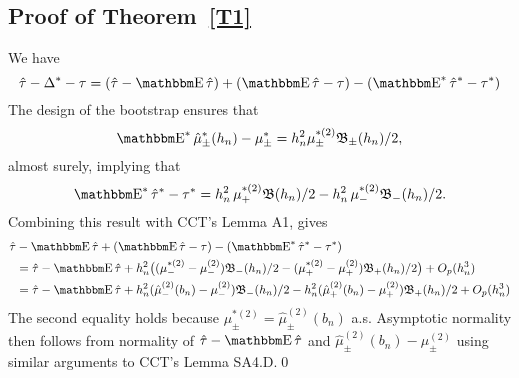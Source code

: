\documentclass[12pt,fleqn]{article}
\begin{document}
\subsection{Proof of Theorem~\ref{T1}}
We have
\begin{equation*}
  \hat\tau - \Delta^* - \tau = (\hat\tau - \E \hat \tau) +
  (\E \hat \tau - \tau) - (\E^* \hat \tau^* - \tau^*)
\end{equation*}
The design of the bootstrap ensures that
\begin{equation*}
  \label{eq:6}
  \E^* \hat\mu_{\pm}^*(h_n) - \mu_{\pm}^{*} =
  h_n^{2} \mu_\pm^{*(2)} \Bf_{\pm}(h_n)/2,
\end{equation*}
almost surely, implying that
\begin{equation*}
  \label{eq:7}
    \E^* \hat\tau^{*} - \tau^{*} = h_n^2\, \mu_+^{*(2)} \Bf(h_n)/2
      - h_n^2\, \mu_{-}^{*(2)} \Bf_{-}(h_n)/2.
\end{equation*}
Combining this result with CCT's Lemma A1, gives
\begin{align*}
  \hat\tau &- \E \hat\tau + (\E \hat\tau - \tau) - (\E^* \hat\tau^* - \tau^*)\\
  &= \hat\tau - \E\hat\tau
   + h_n^2 \big((\mu_{-}^{*(2)} - \mu_{-}^{(2)}) \Bf_{-}(h_{n}) /2
   - (\mu_+^{*(2)}-\mu_+^{(2)}) \Bf_{+}(h_{n}) / 2 \big) + O_p(h_n^{3}) \\
  &= \hat\tau - \E\hat\tau
   + h_n^2 (\hat\mu_-^{(2)}(b_n) - \mu_-^{(2)}) \Bf_{-}(h_{n}) /2
   - h_n^2 (\hat\mu_+^{(2)}(b_n) - \mu_+^{(2)}) \Bf_{+}(h_{n}) / 2 + O_p(h_n^{3})
\end{align*}
The second equality holds because
$\mu_\pm^{*(2)} = \hat\mu_{\pm}^{(2)}(b_n)$ a.s. Asymptotic normality then
follows from normality of $\hat\tau - \E\hat\tau$ and
$\hat\mu_\pm^{(2)}(b_n) - \mu_\pm^{(2)}$ using
similar arguments to CCT's Lemma SA4.D.\qed
\end{document}
